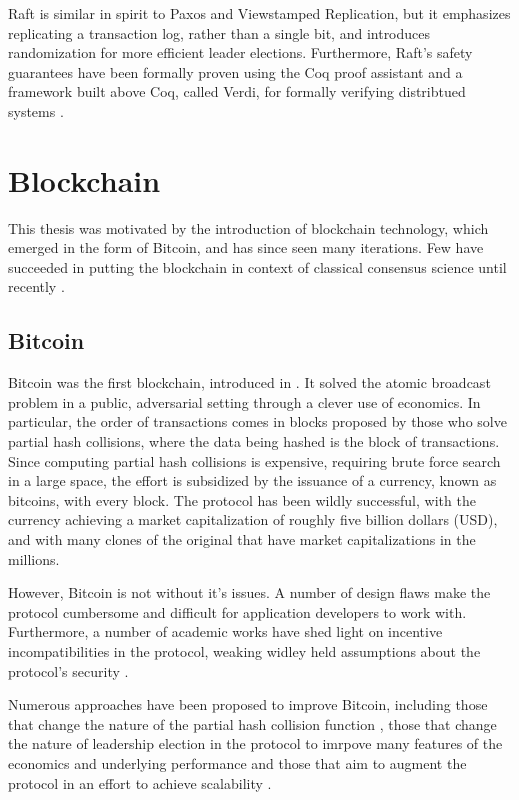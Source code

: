 Raft is similar in spirit to Paxos and Viewstamped Replication, but it emphasizes replicating a transaction log, 
rather than a single bit, and introduces randomization for more efficient leader elections.
Furthermore, Raft's safety guarantees have been formally proven using the Coq proof assistant \cite{woos2016planning}
and a framework built above Coq, called Verdi, for formally verifying distribtued systems \cite{wilcox2015verdi}.

\section{Blockchain}

This thesis was motivated by the introduction of blockchain technology, which emerged in the form of Bitcoin,
and has since seen many iterations.
Few have succeeded in putting the blockchain in context of classical consensus science until recently \cite{vukolic11quest,cachin2016non,miller2016honey}.

\subsection{Bitcoin} 

Bitcoin was the first blockchain, introduced in \cite{bitcoin}.
It solved the atomic broadcast problem in a public, adversarial setting through a clever use of economics.
In particular, the order of transactions comes in blocks proposed by those who solve partial hash collisions,
where the data being hashed is the block of transactions.
Since computing partial hash collisions is expensive, requiring brute force search in a large space,
the effort is subsidized by the issuance of a currency, known as bitcoins, with every block.
The protocol has been wildly successful, with the currency achieving a market capitalization
of roughly five billion dollars (USD), and with many clones of the original that have market capitalizations in the millions.

However, Bitcoin is not without it's issues. A number of design flaws make the protocol cumbersome and difficult 
for application developers to work with.
Furthermore, a number of academic works have shed light on incentive incompatibilities in the protocol,
weaking widley held assumptions about the protocol's security \cite{eyal2014majority,courtois2014subversive}.

Numerous approaches have been proposed to improve Bitcoin,
including those that change the nature of the partial hash collision function \cite{miller2015nonoutsourceable},
those that change the nature of leadership election in the protocol to imrpove many features of the economics and underlying performance \cite{eyal2015bitcoin}
and those that aim to augment the protocol in an effort to achieve scalability \cite{back2014enabling,poon2015bitcoin}.

